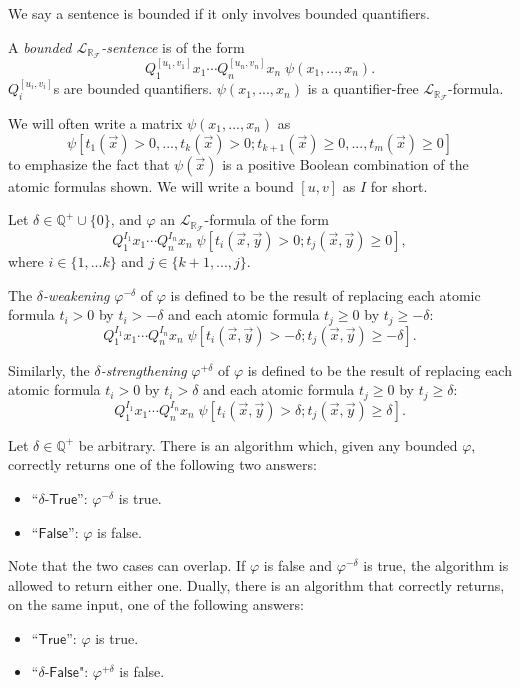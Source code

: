 \documentclass[envcountsect]{llncs}
\newcommand{\lrf}{\mathcal{L}_{\mathbb{R}_{\mathcal{F}}}}
\begin{document}
We say a sentence is bounded if it only involves bounded quantifiers. 
\begin{definition}[Bounded $\lrf$-Sentences]
A {\em bounded $\lrf$-sentence} is of the form
$$Q_1^{[u_1,v_1]}x_1\cdots Q_n^{[u_n,v_n]}x_n\;\psi(x_1,...,x_n).$$
$Q_i^{[u_i,v_i]}$s are bounded quantifiers. $\psi(x_1,...,x_n)$ is a 
quantifier-free $\lrf$-formula.
\end{definition}
We will often write a matrix $\psi(x_1,...,x_n)$ as 
$$\psi[t_1(\vec x)>0,...,t_k(\vec x)>0; t_{k+1}(\vec x)\geq 0,...,t_m(\vec
x)\geq 0]$$ to emphasize the fact that $\psi(\vec x)$ is a positive Boolean
combination of the atomic formulas shown. We will write a bound $[u,v]$ as $I$
for short. 
\begin{definition}
Let $\delta\in \mathbb{Q}^+\cup\{0\}$, and $\varphi$ an
$\lrf$-formula of the form
$$Q_1^{I_1}x_1\cdots Q_n^{I_n}x_n\;\psi[t_i(\vec x, \vec y)>0; t_j(\vec x, \vec
y)\geq 0],$$ where $i\in\{1,...k\}$ and $j\in\{k+1,...,j\}$.

The {\em $\delta$-weakening} $\varphi^{-\delta}$ of $\varphi$ is
defined to  be the result of replacing each atomic formula $t_i > 0$ by $t_i >
-\delta$ and each atomic formula $t_j \geq 0$ by $t_j \geq -\delta$:
$$Q_1^{I_1}x_1\cdots Q_n^{I_n}x_n\;\psi[t_i(\vec x, \vec y)>-\delta; t_j(\vec x,
\vec y)\geq -\delta].$$

Similarly, the {\em $\delta$-strengthening} $\varphi^{+\delta}$ of $\varphi$ is
defined to be the result of replacing each atomic formula $t_i > 0$ by $t_i >
\delta$ and each atomic formula $t_j \geq 0$ by $t_j \geq \delta$:
$$Q_1^{I_1}x_1\cdots Q_n^{I_n}x_n\;\psi[t_i(\vec x, \vec y)>\delta; t_j(\vec x,
\vec y)\geq \delta].$$
\end{definition}
\begin{theorem} Let $\delta\in\mathbb{Q}^+$ be
arbitrary. There is an algorithm which, given any bounded $\varphi$, 
correctly returns one of the following two answers:
\begin{itemize}
\item ``$\delta$-$\mathsf{True}$'': $\varphi^{-\delta}$ is true. 
\item ``$\mathsf{False}$'': $\varphi$ is false. 
\end{itemize}
Note that the two cases can overlap. If $\varphi$ is false and
$\varphi^{-\delta}$ is true, the algorithm is allowed to return either
one. Dually, there is an algorithm that correctly returns, on the same input,
one of the following answers:
\begin{itemize}
\item ``$\mathsf{True}$'': $\varphi$ is true. 
\item ``$\delta$-$\mathsf{False}$": $\varphi^{+\delta}$ is false. 
\end{itemize}
\end{theorem}
\end{document}
